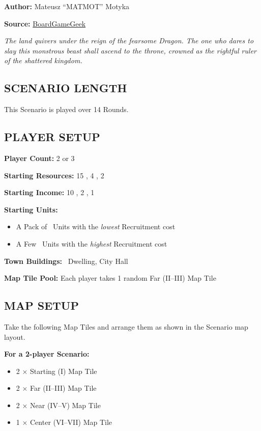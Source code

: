 
\begin{multicols*}{2}

\textbf{Author:} Mateusz ``MATMOT'' Motyka

\textbf{Source:} \href{https://boardgamegeek.com/filepage/277736/clash-scenario-the-hunt-v10}{BoardGameGeek}

\textit{The land quivers under the reign of the fearsome Dragon.
  The one who dares to slay this monstrous beast shall ascend to the throne, crowned as the rightful ruler of the shattered kingdom.
}

\subsection*{\MakeUppercase{Scenario Length}}
This Scenario is played over 14 Rounds.

\subsection*{\MakeUppercase{Player Setup}}
\textbf{Player Count:} 2 or 3

\textbf{Starting Resources:} 15 , 4 , 2 

\textbf{Starting Income:} 10 , 2 , 1 

\textbf{Starting Units:}
\begin{itemize}
  \item A Pack of \bronze\ Units with the \textit{lowest} Recruitment cost
  \item A Few \bronze\ Units with the \textit{highest} Recruitment cost
\end{itemize}

\textbf{Town Buildings:} \bronze\ Dwelling, City Hall

\textbf{Map Tile Pool:} Each player takes 1 random Far (II--III) Map Tile

\subsection*{\MakeUppercase{Map Setup}}

Take the following Map Tiles and arrange them as shown in the Scenario map layout.

\textbf{For a 2-player Scenario:}
\begin{itemize}
  \item 2 × Starting (I) Map Tile
  \item 2 × Far (II--III) Map Tile
  \item 2 × Near (IV--V) Map Tile
  \item 1 × Center (VI--VII) Map Tile
\end{itemize}


\end{multicols*}
